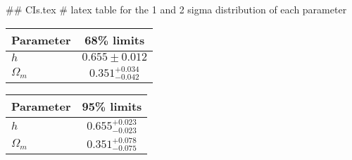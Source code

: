 ## CIs.tex
# latex table for the 1 and 2 sigma distribution of each parameter

\begin{tabular} { l  c}
 Parameter &  68\% limits\\
\hline
{\boldmath$h              $} & $0.655\pm 0.012            $\\
{\boldmath$\Omega_m       $} & $0.351^{+0.034}_{-0.042}   $\\
\hline
\end{tabular}

\begin{tabular} { l  c}
 Parameter &  95\% limits\\
\hline
{\boldmath$h              $} & $0.655^{+0.023}_{-0.023}   $\\
{\boldmath$\Omega_m       $} & $0.351^{+0.078}_{-0.075}   $\\
\hline
\end{tabular}

